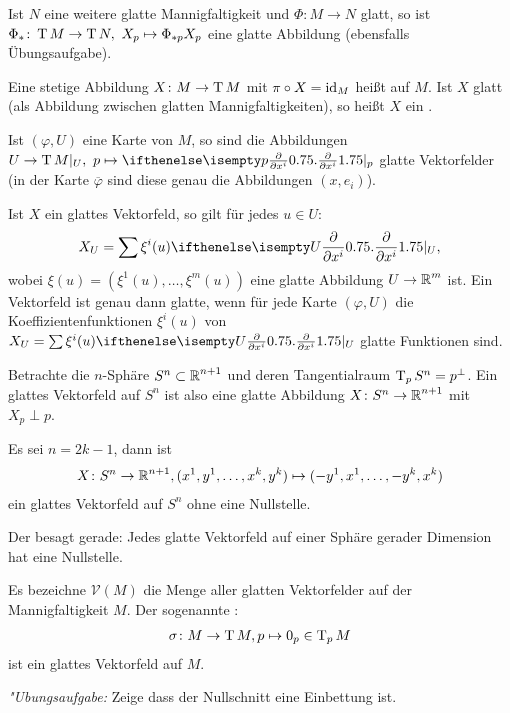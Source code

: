 Ist $N$ eine weitere glatte Mannigfaltigkeit und $\Phi \colon M \to N$ glatt, so ist $\Phi_{*} \colon \operatorname{T} M \to \operatorname{T} N, \ X_p \mapsto \Phi_{*p}X_p$ eine glatte Abbildung (ebensfalls Übungsaufgabe).

\begin{Dfn}
  Eine stetige Abbildung $X \colon M \to \operatorname{T} M$ mit $\pi \circ X = \operatorname{id}_M$ heißt  auf $M$.
  Ist $X$ glatt (als Abbildung zwischen glatten Mannigfaltigkeiten), so heißt $X$ ein .
\end{Dfn}

\begin{bem}
Ist $(\varphi, U)$ eine Karte von $M$, so sind die Abbildungen $U \to \T M|_U, \ p \mapsto \pdifffrac[p]{}{x^{i}}$ glatte Vektorfelder (in der Karte $\overline \varphi$ sind diese genau die Abbildungen $(x,e_i)$).

Ist $X$ ein glattes Vektorfeld, so gilt für jedes $u \in U$:
\begin{align*}
	X_U = \sum \xi^i(u) \pdifffrac[U]{}{x^i},
\end{align*}
wobei $\xi(u) = (\xi^1(u), \ldots, \xi^m(u))$ eine glatte Abbildung $U \to \operatorname{\mathbb{R}}^m$ ist. Ein Vektorfeld ist genau dann glatte, wenn für jede Karte $(\varphi, U)$ die Koeffizientenfunktionen $\xi^i(u)$ von $X_U = \sum \xi^i(u) \pdifffrac[U]{}{x^i}$ glatte Funktionen sind.
\end{bem}



\begin{bsp}
  Betrachte die $n$-Sphäre $S^n \subset \operatorname{\mathbb{R}}^{n+1}$ und deren Tangentialraum $\operatorname{T}_pS^n = p^{\perp}$.
  Ein glattes Vektorfeld auf $S^n$ ist also eine glatte Abbildung $X \colon S^n \to \operatorname{\mathbb{R}}^{n+1}$ mit $X_p \perp p$.
  
  Es sei $n=2k-1$, dann ist
  \begin{align*}
    X \colon S^n \to \operatorname{\mathbb{R}}^{n+1}, (x^1,y^1, \ldots, x^k,y^k) \mapsto (-y^1,x^1, \ldots, -y^k,x^k)
  \end{align*}
  ein glattes Vektorfeld auf $S^n$ ohne eine Nullstelle.
\end{bsp}

\begin{bem}
  Der  besagt gerade: Jedes glatte Vektorfeld auf einer Sphäre gerader Dimension hat eine Nullstelle.
\end{bem}

\begin{bem}
  Es bezeichne $\mathcal V(M)$ die Menge aller glatten Vektorfelder auf der Mannigfaltigkeit $M$. Der sogenannte :
  \begin{align*}
    \sigma \colon M \to \operatorname{T} M, p \mapsto 0_p \in \operatorname{T}_pM
  \end{align*}
  ist ein glattes Vektorfeld auf $M$.
  
  \emph{"Ubungsaufgabe:} Zeige dass der Nullschnitt eine Einbettung ist.
\end{bem}

